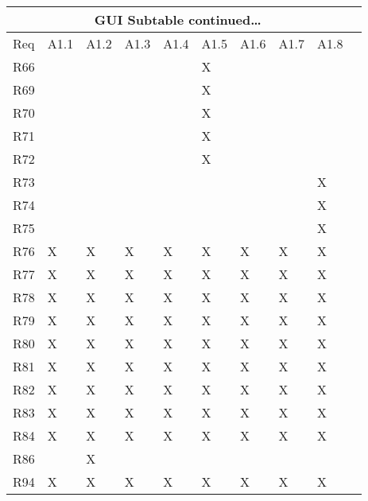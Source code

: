 \documentclass{article}
\begin{document}
\begin{tabular}{|l|l|l|l|l|l|l|l|l|l|}
\hline
\multicolumn{9}{|c|}{GUI Subtable continued\dots}\\\hline
Req& A1.1& A1.2& A1.3& A1.4& A1.5& A1.6& A1.7& A1.8 \\\hline\hline
R66 &&&&&X&&& \\\hline
R69 &&&&&X&&& \\\hline
R70 &&&&&X&&& \\\hline
R71 &&&&&X&&& \\\hline
R72 &&&&&X&&& \\\hline
R73 &&&&&&&&X \\\hline
R74 &&&&&&&&X \\\hline
R75 &&&&&&&&X \\\hline
R76 &X&X&X&X&X&X&X&X \\\hline
R77 &X&X&X&X&X&X&X&X \\\hline
R78 &X&X&X&X&X&X&X&X \\\hline
R79 &X&X&X&X&X&X&X&X \\\hline
R80 &X&X&X&X&X&X&X&X \\\hline
R81 &X&X&X&X&X&X&X&X \\\hline
R82 &X&X&X&X&X&X&X&X\\\hline
R83 &X&X&X&X&X&X&X&X\\\hline
R84 &X&X&X&X&X&X&X&X\\\hline
R86 &&X&&&&&& \\\hline
R94 &X&X&X&X&X&X&X&X \\\hline
\end{tabular}
\end{document}
